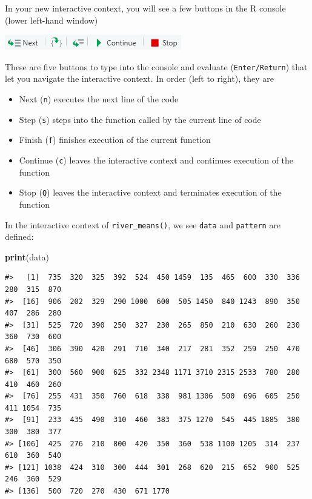 \documentclass[
]{book}
\newenvironment{Shaded}{\begin{snugshade}}{\end{snugshade}}
\newcommand{\KeywordTok}[1]{\textcolor[rgb]{0.13,0.29,0.53}{\textbf{#1}}}
\newcommand{\NormalTok}[1]{#1}
\providecommand{\tightlist}{%
  \setlength{\itemsep}{0pt}\setlength{\parskip}{0pt}}
\begin{document}
In your new interactive context, you will see a few buttons in the R console (lower left-hand window)

\includegraphics[width=1\linewidth]{images/newrpack_files8}

These are five buttons to type into the console and evaluate (\texttt{Enter/Return}) that let you navigate the interactive context. In order (left to right), they are

\begin{itemize}
\tightlist
\item
  Next (\texttt{n}) executes the next line of the code
\item
  Step (\texttt{s}) steps into the function called by the current line of code
\item
  Finish (\texttt{f}) finishes execution of the current function
\item
  Continue (\texttt{c}) leaves the interactive context and continues execution of the function
\item
  Stop (\texttt{Q}) leaves the interactive context and terminates execution of the function
\end{itemize}

In the interactive context of \texttt{river\_means()}, we see \texttt{data} and \texttt{pattern} are defined:

\begin{Shaded}
\begin{Highlighting}[]
\KeywordTok{print}\NormalTok{(data)}
\end{Highlighting}
\end{Shaded}

\begin{verbatim}
#>   [1]  735  320  325  392  524  450 1459  135  465  600  330  336  280  315  870
#>  [16]  906  202  329  290 1000  600  505 1450  840 1243  890  350  407  286  280
#>  [31]  525  720  390  250  327  230  265  850  210  630  260  230  360  730  600
#>  [46]  306  390  420  291  710  340  217  281  352  259  250  470  680  570  350
#>  [61]  300  560  900  625  332 2348 1171 3710 2315 2533  780  280  410  460  260
#>  [76]  255  431  350  760  618  338  981 1306  500  696  605  250  411 1054  735
#>  [91]  233  435  490  310  460  383  375 1270  545  445 1885  380  300  380  377
#> [106]  425  276  210  800  420  350  360  538 1100 1205  314  237  610  360  540
#> [121] 1038  424  310  300  444  301  268  620  215  652  900  525  246  360  529
#> [136]  500  720  270  430  671 1770
\end{verbatim}
\end{document}
